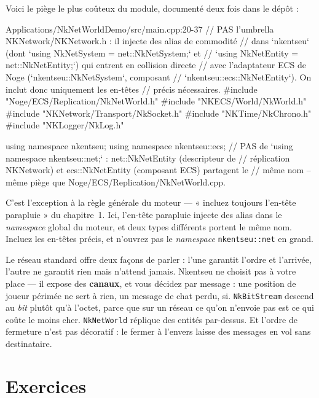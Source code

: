 \begin{nkpiege}
Voici le piège le plus coûteux du module, documenté deux fois dans le dépôt :

\begin{nkcode}{Applications/NkNetWorldDemo/src/main.cpp:20-37}
// PAS l'umbrella NKNetwork/NKNetwork.h : il injecte des alias de commodité
// dans `nkentseu` (dont `using NkNetSystem = net::NkNetSystem;` et
// `using NkNetEntity = net::NkNetEntity;`) qui entrent en collision directe
// avec l'adaptateur ECS de Noge (`nkentseu::NkNetSystem`, composant
// `nkentseu::ecs::NkNetEntity`). On inclut donc uniquement les en-têtes
// précis nécessaires.
#include "Noge/ECS/Replication/NkNetWorld.h"
#include "NKECS/World/NkWorld.h"
#include "NKNetwork/Transport/NkSocket.h"
#include "NKTime/NkChrono.h"
#include "NKLogger/NkLog.h"

using namespace nkentseu;
using namespace nkentseu::ecs;
// PAS de `using namespace nkentseu::net;` : net::NkNetEntity (descripteur de
// réplication NKNetwork) et ecs::NkNetEntity (composant ECS) partagent le
// même nom -- même piège que Noge/ECS/Replication/NkNetWorld.cpp.
\end{nkcode}

C'est l'exception à la règle générale du moteur — « incluez toujours l'en-tête
parapluie » du chapitre~1. Ici, l'en-tête parapluie injecte des alias dans le
\emph{namespace} global du moteur, et deux types différents portent le même nom.
Incluez les en-têtes précis, et n'ouvrez pas le \emph{namespace}
\texttt{nkentseu::net} en grand.
\end{nkpiege}

\begin{nkbilan}
Le réseau standard offre deux façons de parler : l'une garantit l'ordre et
l'arrivée, l'autre ne garantit rien mais n'attend jamais. Nkentseu ne choisit pas
à votre place --- il expose des \textbf{canaux}, et vous décidez par message :
une position de joueur périmée ne sert à rien, un message de chat perdu, si.
\texttt{NkBitStream} descend au \emph{bit} plutôt qu'à l'octet, parce que sur un
réseau ce qu'on n'envoie pas est ce qui coûte le moins cher.
\texttt{NkNetWorld} réplique des entités par-dessus. Et l'ordre de fermeture n'est
pas décoratif : le fermer à l'envers laisse des messages en vol sans
destinataire.
\end{nkbilan}

\section{Exercices}


